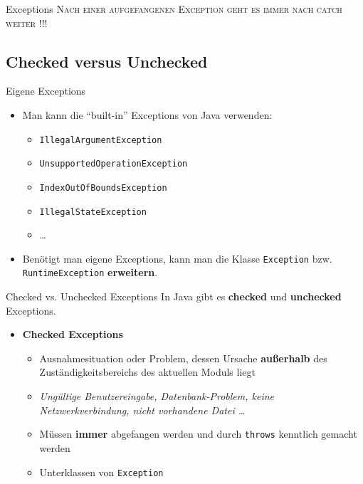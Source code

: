\documentclass[18pt]{beamer}
\newcommand{\quotes}[1]{``#1''}
\begin{document}
\begin{frame}{Exceptions}
    \alert{\huge{\textsc{Nach einer aufgefangenen Exception geht es immer nach catch weiter !!!}}}
\end{frame}

\subsection{Checked versus Unchecked}


\begin{frame}{Eigene Exceptions}
    \begin{itemize}
        \item Man kann die \quotes{built-in} Exceptions von Java verwenden:
        \begin{itemize}
            \item \texttt{IllegalArgumentException}
            \item \texttt{UnsupportedOperationException}
            \item \texttt{IndexOutOfBoundsException}
            \item \texttt{IllegalStateException}
            \item \dots
        \end{itemize}
        \vspace{.2in}
        \item Benötigt man eigene Exceptions, kann man die Klasse \texttt{Exception} bzw. \texttt{RuntimeException} \textbf{erweitern}.
    \end{itemize}

\end{frame}


\begin{frame}{Checked vs. Unchecked Exceptions}
    In Java gibt es \textbf{checked} und \textbf{unchecked} Exceptions.
    \vspace{.2in}
    \begin{itemize}
        \item \textbf{Checked Exceptions}
        \begin{itemize}
            \item Ausnahmesituation oder Problem, dessen Ursache \textbf{außerhalb} des Zuständigkeitsbereichs des aktuellen Moduls liegt
            \item \textit{Ungültige Benutzereingabe, Datenbank-Problem, keine Netzwerkverbindung, nicht vorhandene Datei \dots}
            \item Müssen \textbf{immer} abgefangen werden und durch \texttt{throws} kenntlich gemacht werden
            \item Unterklassen von \texttt{Exception}
        \end{itemize}
    \end{itemize}

\end{frame}
\end{document}
